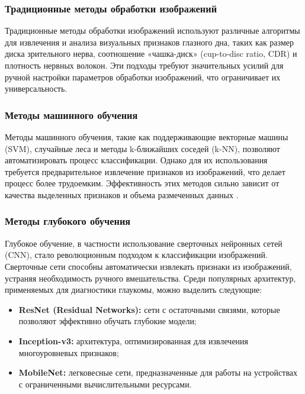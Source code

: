 {    \subsubsection*{Традиционные методы обработки изображений}

    Традиционные методы обработки изображений используют различные алгоритмы для извлечения и анализа визуальных признаков глазного дна, таких как размер диска зрительного нерва, соотношение «чашка-диск» (cup-to-disc ratio, CDR) и плотность нервных волокон. Эти подходы требуют значительных усилий для ручной настройки параметров обработки изображений, что ограничивает их универсальность.

    \subsubsection*{Методы машинного обучения}

    Методы машинного обучения, такие как поддерживающие векторные машины (SVM), случайные леса и методы k-ближайших соседей (k-NN), позволяют автоматизировать процесс классификации. Однако для их использования требуется предварительное извлечение признаков из изображений, что делает процесс более трудоемким. Эффективность этих методов сильно зависит от качества выделенных признаков и объема размеченных данных \cite{machine_learnig}.

    \subsubsection*{Методы глубокого обучения}

    Глубокое обучение, в частности использование сверточных нейронных сетей (CNN), стало революционным подходом к классификации изображений. Сверточные сети способны автоматически извлекать признаки из изображений, устраняя необходимость ручного вмешательства. Среди популярных архитектур, применяемых для диагностики глаукомы, можно выделить следующие:
    \begin{itemize}
        \item \textbf{ResNet (Residual Networks):} сети с остаточными связями, которые позволяют эффективно обучать глубокие модели;
        \item \textbf{Inception-v3:} архитектура, оптимизированная для извлечения многоуровневых признаков;
        \item \textbf{MobileNet:} легковесные сети, предназначенные для работы на устройствах с ограниченными вычислительными ресурсами.
    \end{itemize}

}
